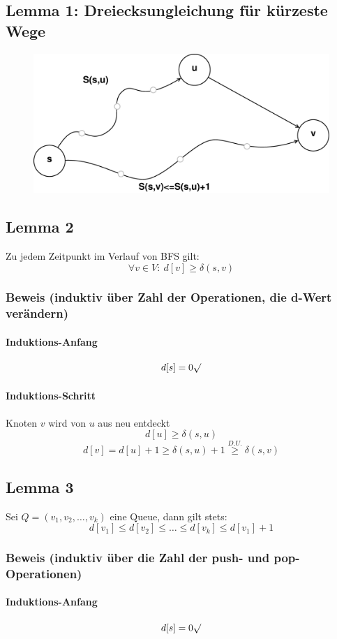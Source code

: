\subsection{Lemma 1: Dreiecksungleichung für kürzeste Wege}
\begin{figure}[h]
\centering
\includegraphics[width=0.7\linewidth]{16/Grafik/Dreiecksungleichung}
\caption{}
\label{fig:Dreiecksungleichung}
\end{figure}

\subsection{Lemma 2}
Zu jedem Zeitpunkt im Verlauf von BFS gilt:
\[ \forall v\in V:~ d[v] \geq \delta(s,v)\]
\subsubsection{Beweis (induktiv über Zahl der Operationen, die d-Wert verändern)}
\paragraph{Induktions-Anfang} \[ d[s] = 0 \surd\]
\paragraph{Induktions-Schritt} Knoten $v$ wird von $u$ aus neu entdeckt
\[ d[u]\geq \delta(s,u) \]
\[ d[v] = d[u]+1 \geq \delta(s,u)+1 \overset{D.U.}{\geq} \delta(s,v) \]
\subsection{Lemma 3}
Sei $Q=(v_1,v_2,\ldots,v_k)$ eine Queue, dann gilt stets:
\[ d[v_1]\leq d[v_2]\leq\ldots\leq d[v_k]\leq d[v_1]+1 \]
\subsubsection{Beweis (induktiv über die Zahl der push- und pop-Operationen)}
\paragraph{Induktions-Anfang}
\[ d[s] = 0 \surd\]
